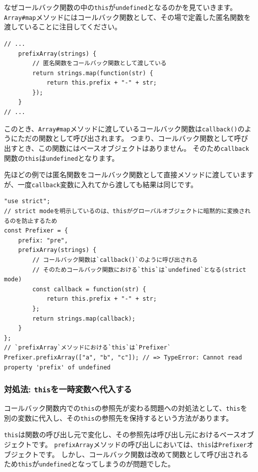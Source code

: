 なぜコールバック関数の中の\texttt{this}が\texttt{undefined}となるのかを見ていきます。
\texttt{Array\#map}メソッドにはコールバック関数として、その場で定義した匿名関数を渡していることに注目してください。

\begin{lstlisting}
// ...
    prefixArray(strings) {
        // 匿名関数をコールバック関数として渡している
        return strings.map(function(str) {
            return this.prefix + "-" + str;
        });
    }
// ...
\end{lstlisting}

このとき、\texttt{Array\#map}メソッドに渡しているコールバック関数は\texttt{callback()}のようにただの関数として呼び出されます。
つまり、コールバック関数として呼び出すとき、この関数にはベースオブジェクトはありません。
そのため\texttt{callback}関数の\texttt{this}は\texttt{undefined}となります。

先ほどの例では匿名関数をコールバック関数として直接メソッドに渡していますが、一度\texttt{callback}変数に入れてから渡しても結果は同じです。

\begin{lstlisting}
"use strict";
// strict modeを明示しているのは、thisがグローバルオブジェクトに暗黙的に変換されるのを防止するため
const Prefixer = {
    prefix: "pre",
    prefixArray(strings) {
        // コールバック関数は`callback()`のように呼び出される
        // そのためコールバック関数における`this`は`undefined`となる(strict mode)
        const callback = function(str) {
            return this.prefix + "-" + str;
        };
        return strings.map(callback);
    }
};
// `prefixArray`メソッドにおける`this`は`Prefixer`
Prefixer.prefixArray(["a", "b", "c"]); // => TypeError: Cannot read property 'prefix' of undefined
\end{lstlisting}

\hypertarget{substitute-this}{%
\subsubsection{\texorpdfstring{対処法:
\texttt{this}を一時変数へ代入する}{対処法: thisを一時変数へ代入する}}\label{substitute-this}}

コールバック関数内での\texttt{this}の参照先が変わる問題への対処法として、\texttt{this}を別の変数に代入し、その\texttt{this}の参照先を保持するという方法があります。

\texttt{this}は関数の呼び出し元で変化し、その参照先は呼び出し元におけるベースオブジェクトです。
\texttt{prefixArray}メソッドの呼び出しにおいては、\texttt{this}は\texttt{Prefixer}オブジェクトです。
しかし、コールバック関数は改めて関数として呼び出されるため\texttt{this}が\texttt{undefined}となってしまうのが問題でした。

